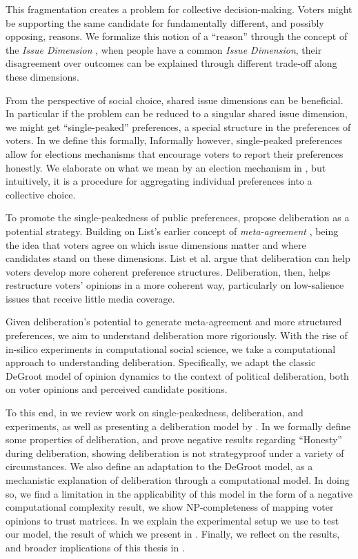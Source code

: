 This fragmentation creates a problem for collective decision-making. Voters
might be supporting the same candidate for fundamentally different, and
possibly opposing, reasons. We formalize this notion of a ``reason''
through the concept of the \textit{Issue Dimension}
\cite{listTwoConceptsAgreement2002}, when people have a common \textit{Issue
	Dimension}, their disagreement over outcomes can be explained
through different trade-off along these dimensions.

From the perspective of social choice, shared issue dimensions can be
beneficial. In particular if the problem can be reduced to a singular shared
issue dimension,  we might get ``single-peaked'' preferences, a special
structure in the preferences of voters.  In  we define this
formally, Informally however, single-peaked preferences allow for elections mechanisms
that encourage voters to report their preferences honestly. We elaborate on
what we mean by an election mechanism in , but
intuitively, it is a procedure for aggregating individual preferences into a
collective choice.

To promote the single-peakedness of public preferences,
\citet{listDeliberationSinglePeakednessPossibility2013} propose deliberation as
a potential strategy. Building on List's earlier concept of
\emph{meta-agreement} \cite{listTwoConceptsAgreement2002}, being the idea that
voters agree on which issue dimensions matter and where candidates stand
on these dimensions. List et al. argue that deliberation can help voters
develop more coherent preference structures. Deliberation, then, helps
restructure voters' opinions in a more coherent way, particularly on
low-salience issues that receive little media coverage.

Given deliberation's potential to generate meta-agreement and more structured
preferences, we aim to understand deliberation more rigoriously.  With the rise
of in-silico experiments in computational social science, we take a
computational approach to understanding deliberation. Specifically, we adapt
the classic DeGroot model of opinion dynamics
\cite{degrootReachingConsensus1974} to the context of political deliberation,
both on voter opinions and perceived candidate positions.

To this end, in  we review work on
single-peakedness, deliberation, and experiments, as well as presenting a
deliberation model by \citet{radDeliberationSinglePeakednessCoherent2021}. In
 we formally define some properties of deliberation, and prove
negative results regarding ``Honesty'' during deliberation, showing
deliberation is not strategyproof under a variety of circumstances. We also
define an adaptation to the DeGroot model, as a mechanistic explanation of
deliberation through a computational model. In doing so, we find a limitation
in the applicability of  this model in the form of a negative computational
complexity result, we show NP-completeness of mapping voter opinions to trust
matrices. In  we explain the experimental setup we use to test
our model, the result of which we present in .
Finally, we reflect on the results, and broader implications of this thesis in .

